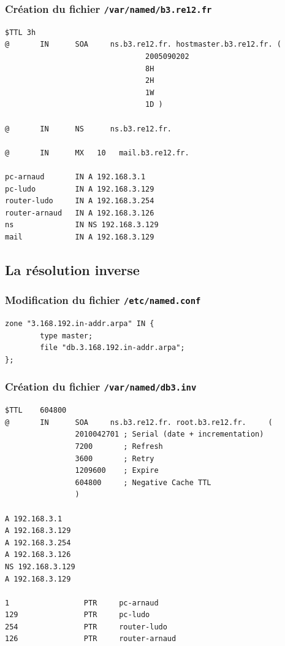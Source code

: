 \documentclass[12pt,a4paper,notitlepage]{article}
\begin{document}
\subsubsection{Création du fichier \texttt{/var/named/b3.re12.fr}}

\begin{lstlisting}
$TTL 3h
@       IN      SOA     ns.b3.re12.fr. hostmaster.b3.re12.fr. (
                                2005090202
                                8H
                                2H
                                1W
                                1D )

@       IN      NS      ns.b3.re12.fr.

@       IN      MX   10   mail.b3.re12.fr.

pc-arnaud       IN A 192.168.3.1
pc-ludo         IN A 192.168.3.129
router-ludo     IN A 192.168.3.254
router-arnaud   IN A 192.168.3.126
ns              IN NS 192.168.3.129
mail            IN A 192.168.3.129
\end{lstlisting}

\clearpage
\subsection{La résolution inverse}

\subsubsection{Modification du fichier \texttt{/etc/named.conf}}

\begin{lstlisting}
zone "3.168.192.in-addr.arpa" IN {
        type master;
        file "db.3.168.192.in-addr.arpa";
};
\end{lstlisting}

\subsubsection{Création du fichier \texttt{/var/named/db3.inv}}

\begin{lstlisting}
$TTL    604800
@       IN      SOA     ns.b3.re12.fr. root.b3.re12.fr.     (
                2010042701 ; Serial (date + incrementation)
                7200       ; Refresh
                3600       ; Retry
                1209600    ; Expire
                604800     ; Negative Cache TTL
                )

A 192.168.3.1
A 192.168.3.129
A 192.168.3.254
A 192.168.3.126
NS 192.168.3.129
A 192.168.3.129

1                 PTR     pc-arnaud
129               PTR     pc-ludo
254               PTR     router-ludo
126               PTR     router-arnaud
\end{lstlisting}
\end{document}
